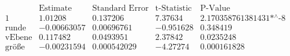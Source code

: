 \[\begin{array}{l|llll}
 \text{} & \text{Estimate} & \text{Standard Error} & \text{t-Statistic} & \text{P-Value} \\
\hline
 1 & 1.01208 & 0.137206 & 7.37634 & \text{2.170358761381431$\grave{ }$*${}^{\wedge}$-8} \\
 \text{runde} & -0.00663057 & 0.00696761 & -0.951628 & 0.348419 \\
 \text{vEbene} & 0.117482 & 0.0493951 & 2.37842 & 0.0235248 \\
 \text{gr{\" o}{\ss}e} & -0.00231594 & 0.000542029 & -4.27274 & 0.000161828 \\
\end{array}\]

